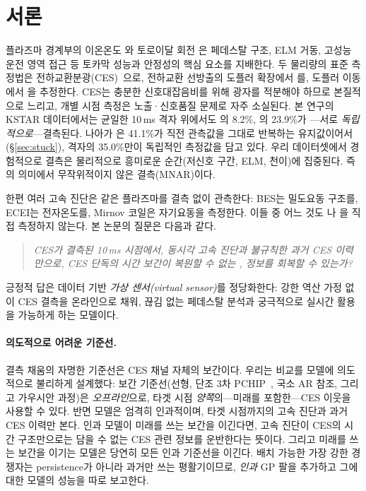 \documentclass[10pt,a4paper]{article}
\begin{document}
\section{서론}
\label{sec:intro}

플라즈마 경계부의 이온온도 \Ti{}와 토로이달 회전 \Vrot{}은 페데스탈 구조, ELM
거동, 고성능 운전 영역 접근 등 토카막 성능과 안정성의 핵심 요소를 지배한다. 두
물리량의 표준 측정법은 전하교환분광(CES)~\citep{Ko2010ChargeExchange}으로,
전하교환 선방출의 도플러 확장에서 \Ti{}를, 도플러 이동에서 \Vrot{}을 추정한다.
CES는 충분한 신호대잡음비를 위해 광자를 적분해야 하므로 본질적으로 느리고,
개별 시점 측정은 노출·신호품질 문제로 자주 소실된다. 본 연구의 KSTAR
데이터에서는 균일한 10\,ms 격자 위에서도 \Ti{}의 8.2\%, \Vrot{}의 23.9\%가
---서로 \emph{독립적으로}---결측된다. 나아가 \Vrot{}은 41.1\%가 직전 관측값을
그대로 반복하는 유지값이어서(\S\ref{sec:stuck}), 격자의 35.0\%만이 독립적인
\Vrot{} 측정값을 담고 있다. 우리 데이터셋에서 경험적으로 결측은
물리적으로 흥미로운 순간(저신호 구간, ELM, 천이)에 집중된다. 즉
\citet{Little2002StatisticalAnalysis}의 의미에서 무작위적이지 않은
결측(MNAR)이다.

한편 여러 고속 진단은 같은 플라즈마를 결측 없이 관측한다: BES는 밀도요동
구조를, ECEI는 전자온도를, Mirnov 코일은 자기요동을 측정한다. 이들 중 어느
것도 \Ti{}나 \Vrot{}을 직접 측정하지 않는다. 본 논문의 질문은 다음과 같다.

\begin{quote}
\emph{CES가 결측된 10\,ms 시점에서, 동시각 고속 진단과 불규칙한 과거 CES
이력만으로, CES 단독의 시간 보간이 복원할 수 없는 \Ti{}, \Vrot{} 정보를 회복할
수 있는가?}
\end{quote}

긍정적 답은 데이터 기반 \emph{가상 센서(virtual sensor)}를 정당화한다: 강한
역산 가정 없이 CES 결측을 온라인으로 채워, 끊김 없는 페데스탈 분석과 궁극적으로
실시간 활용을 가능하게 하는 모델이다.

\paragraph{의도적으로 어려운 기준선.}
결측 채움의 자명한 기준선은 CES 채널 자체의 보간이다. 우리는 비교를 모델에
의도적으로 불리하게 설계했다: 보간 기준선(선형, 단조 3차
PCHIP~\citep{fritsch1980}, 국소 AR 참조, 그리고 가우시안 과정)은
\emph{오프라인}으로, 타겟 시점 \emph{양쪽}의---미래를 포함한---CES 이웃을 사용할
수 있다. 반면 모델은 엄격히 인과적이며, 타겟 시점까지의 고속 진단과 과거 CES
이력만 본다. 인과 모델이 미래를 쓰는 보간을 이긴다면, 고속 진단이 CES의 시간
구조만으로는 담을 수 없는 CES 관련 정보를 운반한다는 뜻이다. 그리고 미래를 쓰는
보간을 이기는 모델은 당연히 모든 인과 기준선을 이긴다. 배치 가능한 가장 강한
경쟁자는 persistence가 아니라 과거만 쓰는 평활기이므로, \emph{인과} GP 팔을
추가하고 그에 대한 모델의 성능을 따로 보고한다.
\end{document}
